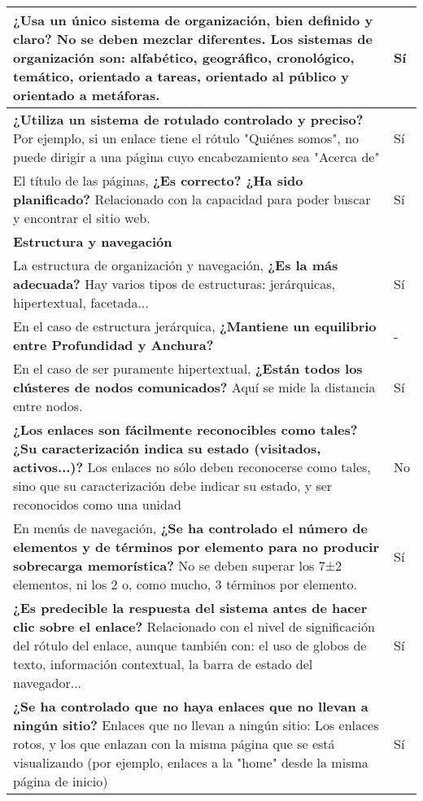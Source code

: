 \begin{longtable}[H]{p{31em}|p{5em}}
\textbf{¿Usa un único sistema de organización, bien definido y claro?} No se deben mezclar diferentes. Los sistemas de organización son: alfabético, geográfico, cronológico, temático, orientado a tareas, orientado al público y orientado a metáforas. & Sí \\ \hline
\textbf{¿Utiliza un sistema de rotulado controlado y preciso?} Por ejemplo, si un enlace tiene el rótulo "Quiénes somos", no puede dirigir a una página cuyo encabezamiento sea "Acerca de" & Sí \\ \hline
El título de las páginas, \textbf{¿Es correcto? ¿Ha sido planificado?} Relacionado con la capacidad para poder buscar y encontrar el sitio web. & Sí \\ \hline
\multicolumn{2}{p{36em}}{\cellcolor[rgb]{ .851,  .886,  .953} \textbf{Estructura y navegación}} \\ \hline
La estructura de organización y navegación, \textbf{¿Es la más adecuada?} Hay varios tipos de estructuras: jerárquicas, hipertextual, facetada... & Sí \\ \hline
En el caso de estructura jerárquica, \textbf{¿Mantiene un equilibrio entre Profundidad y Anchura?} & - \\ \hline
En el caso de ser puramente hipertextual, \textbf{¿Están todos los clústeres de nodos comunicados?} Aquí se mide la distancia entre nodos. & Sí \\ \hline
\textbf{¿Los enlaces son fácilmente reconocibles como tales? ¿Su caracterización indica su estado (visitados, activos...)?} Los enlaces no sólo deben reconocerse como tales, sino que su caracterización debe indicar su estado, y ser reconocidos como una unidad  & No \\ \hline
En menús de navegación, \textbf{¿Se ha controlado el número de elementos y de términos por elemento para no producir sobrecarga memorística?} No se deben superar los 7±2 elementos, ni los 2 o, como mucho, 3 términos por elemento. & Sí \\ \hline
\textbf{¿Es predecible la respuesta del sistema antes de hacer clic sobre el enlace?} Relacionado con el nivel de significación del rótulo del enlace, aunque también con: el uso de globos de texto, información contextual, la barra de estado del navegador... & Sí \\ \hline
\textbf{¿Se ha controlado que no haya enlaces que no llevan a ningún sitio?} Enlaces que no llevan a ningún sitio: Los enlaces rotos, y los que enlazan con la misma página que se está visualizando (por ejemplo, enlaces a la "home" desde la misma página de inicio) & Sí \\ \hline

\end{longtable}
